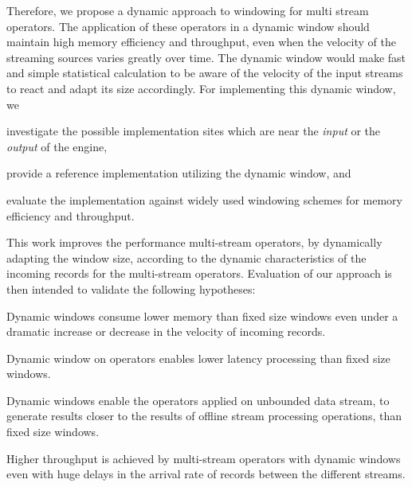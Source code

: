 Therefore, we propose a dynamic approach to windowing for multi stream operators.
The application of these operators in a dynamic window should maintain high memory efficiency and throughput,
even when the velocity of the streaming sources varies greatly over time. 
The dynamic window would make fast and simple statistical calculation to be 
aware of the velocity of the input streams to react and adapt its size accordingly. 
For implementing this dynamic window, we 
\renewcommand{\labelenumi}{(\roman{enumi})}
\begin{enumerate*}
    \item investigate the possible implementation sites which are near the \emph{input}
    or the \emph{output} of the engine, 
    \item provide a reference implementation utilizing the dynamic window, and 
    \item evaluate the implementation against widely used windowing schemes for 
    memory efficiency and throughput. 
\end{enumerate*}


This work improves the performance multi-stream operators, 
by dynamically adapting the window size, according to the dynamic characteristics
of the incoming records for the multi-stream operators. Evaluation of 
our approach is then intended to validate the following hypotheses: 

\begin{hyp}
    Dynamic windows consume lower memory than 
    fixed size windows even under a dramatic increase or 
    decrease in the velocity of incoming records. 
\end{hyp}

\begin{hyp}
    Dynamic window on operators enables lower latency 
    processing than fixed size windows. 
\end{hyp}

\begin{hyp}
    Dynamic windows enable the operators applied on
    unbounded data stream, to generate 
    results closer to the results of offline stream processing operations, 
    than fixed size windows. 
\end{hyp}
\begin{hyp}
    Higher throughput is achieved by multi-stream operators 
    with dynamic windows even with huge delays in the arrival
    rate of records between the different streams.
\end{hyp}

